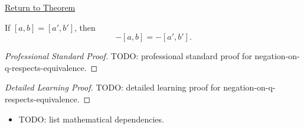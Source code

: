 \newpage
{}
\label{prf:negation-on-q-respects-equivalence}

\begin{remark*}[Return]
\hyperref[lem:negation-on-q-respects-equivalence]{Return to Theorem}
\end{remark*}

\begin{lemma*}
If $[a,b]=[a',b']$, then
\[
-[a,b]=-[a',b'].
\]
\end{lemma*}

\begin{proof}[Professional Standard Proof]
\LRAProofBodyStart
TODO: professional standard proof for negation-on-q-respects-equivalence.
\end{proof}

\begin{proof}[Detailed Learning Proof]
\LRAProofBodyStart
TODO: detailed learning proof for negation-on-q-respects-equivalence.
\end{proof}

\begin{remark*}
\end{remark*}

\begin{dependencies}
\begin{itemize}
  \item TODO: list mathematical dependencies.
\end{itemize}
\end{dependencies}

\clearpage
